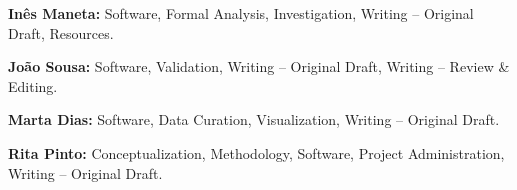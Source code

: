\textbf{Inês Maneta:} Software, Formal Analysis, Investigation,
Writing -- Original Draft, Resources.

\textbf{João Sousa:} Software, Validation, Writing -- Original
Draft, Writing -- Review \& Editing.

\textbf{Marta Dias:} Software, Data Curation, Visualization,
Writing -- Original Draft.

\textbf{Rita Pinto:} Conceptualization, Methodology, Software,
Project Administration, Writing -- Original Draft.




\newpage





